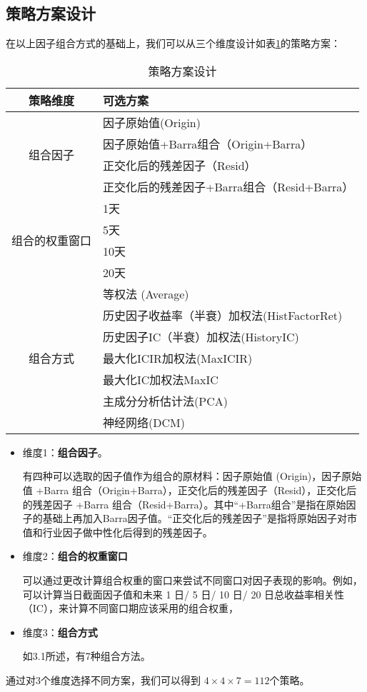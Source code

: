 \documentclass[11pt]{article}
\begin{document}
\subsection{策略方案设计}
在以上因子组合方式的基础上，我们可以从三个维度设计如表\ref{tab: combo_method}的策略方案：
\begin{table}[H]
  \centering
  \caption{策略方案设计}
    \begin{tabular}{cl}
    \toprule
    \multicolumn{1}{c}{策略维度} & 可选方案 \\
    \midrule
    \multirow{4}[2]{*}{组合因子} & 因子原始值(Origin) \\
          & 因子原始值+Barra组合（Origin+Barra） \\
          & 正交化后的残差因子（Resid） \\
          & 正交化后的残差因子+Barra组合（Resid+Barra） \\
    \hline
    \multirow{4}[2]{*}{组合的权重窗口} & \multicolumn{1}{l}{1天} \\
          & \multicolumn{1}{l}{5天} \\
          & \multicolumn{1}{l}{10天} \\
          & \multicolumn{1}{l}{20天} \\
    \hline
    \multirow{7}[2]{*}{组合方式} & 等权法 (Average)\\
          & 历史因子收益率（半衰）加权法(HistFactorRet) \\
          & 历史因子IC（半衰）加权法(HistoryIC) \\
          & 最大化ICIR加权法(MaxICIR) \\
          & 最大化IC加权法MaxIC \\
          & 主成分分析估计法(PCA) \\
          & 神经网络(DCM) \\
    \bottomrule
    \end{tabular}%
  \label{tab: combo_method}%
\end{table}

\begin{itemize}
    \item 维度1：\textbf{组合因子}。
    
    有四种可以选取的因子值作为组合的原材料：因子原始值 (Origin)，因子原始值 +Barra 组合（Origin+Barra），正交化后的残差因子（Resid），正交化后的残差因子 +Barra 组合（Resid+Barra）。其中“+Barra组合”是指在原始因子的基础上再加入Barra因子值。“正交化后的残差因子”是指将原始因子对市值和行业因子做中性化后得到的残差因子。
    \item 维度2：\textbf{组合的权重窗口}
    
    可以通过更改计算组合权重的窗口来尝试不同窗口对因子表现的影响。例如，可以计算当日截面因子值和未来 1 日/ 5 日/ 10 日/ 20 日总收益率相关性（IC），来计算不同窗口期应该采用的组合权重，
    \item 维度3：\textbf{组合方式}
    
    如3.1所述，有7种组合方法。
\end{itemize}
通过对3个维度选择不同方案，我们可以得到 $4 \times 4 \times 7 = 112$个策略。
\end{document}
